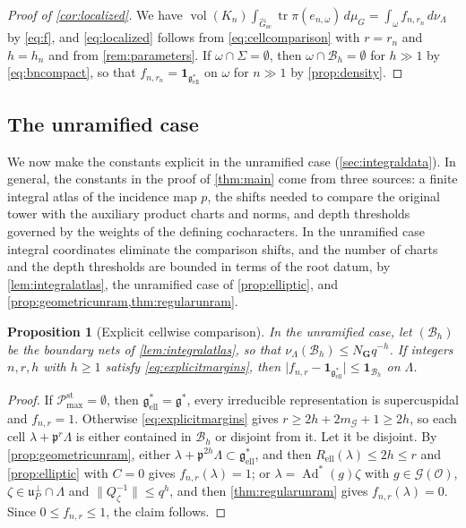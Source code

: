 \documentclass[11pt,reqno]{amsart}
\numberwithin{equation}{section}
\theoremstyle{plain}
\newtheorem{proposition}[theorem]{Proposition}
\theoremstyle{definition}
\theoremstyle{remark}
\theoremstyle{plain}
\newcommand{\OO}{\mathcal{O}}    %
\newcommand{\pp}{\mathfrak{p}}   %
\newcommand{\Lat}{\mathcal{L}}   %
\newcommand{\dLat}{\Lambda}      %
\newcommand{\bG}{\mathbf{G}}     %
\newcommand{\g}{\mathfrak{g}}    %
\newcommand{\gd}{\mathfrak{g}^*} %
\newcommand{\uu}{\mathfrak{u}}   %
\newcommand{\Ell}[2][]{#2_{#1\mathrm{ell}}}   %
\newcommand{\Bad}{\mathcal{B}}   %
\newcommand{\bnets}{boundary nets}
\newcommand{\Pc}{\mathscr{P}^{\mathrm{st}}_{\mathrm{max}}}    %
\newcommand{\Pcss}{\mathscr{P}^{\mathrm{ss}}_{\mathrm{max}}}  %
\newcommand{\Nss}{N_{\bG}}  %
\newcommand{\Gsc}{\widehat{G}_{\mathrm{sc}}}    %
\newcommand{\cG}{\mathcal{G}}                   %
\newcommand{\one}{\mathbf{1}}
\newcommand{\abs}[1]{\lvert#1\rvert}
\newcommand{\norm}[1]{\lVert#1\rVert}
\DeclareMathOperator{\vol}{vol}
\DeclareMathOperator{\tr}{tr}
\DeclareMathOperator{\Ad}{Ad}
\newcommand{\erad}{R_{\mathrm{ell}}}
\newcommand{\lf}{\lambda}
\newcommand{\cell}{\omega}
\newcommand{\nf}{\zeta}
\newcommand{\Crv}{\Sigma}
\newcommand{\iatlas}{integral atlas}
\begin{document}
\begin{proof}[Proof of \cref{cor:localized}]
We have
$\vol(K_n)\int_{\Gsc}\tr\pi(e_{n,\cell})\,d\mu_G=\int_\cell f_{n,r_n}\,d\nu_{\dLat}$ by
\eqref{eq:f}, and \eqref{eq:localized} follows from \eqref{eq:cellcomparison}
with $r=r_n$ and $h=h_n$ and from \cref{rem:parameters}. If
$\cell\cap\Crv=\emptyset$, then $\cell\cap\Bad_h=\emptyset$ for $h\gg1$ by
\eqref{eq:bncompact}, so that $f_{n,r_n}=\one_{\Ell{\gd}}$ on $\cell$
for $n\gg1$ by \cref{prop:density}.
\end{proof}

\subsection{The unramified case}\label{sec:uniform}
We now make the constants explicit in the unramified case
(\cref{sec:integraldata}). In general, the constants in the proof of
\cref{thm:main} come from three sources: a finite \iatlas{} of the incidence
map $p$, the shifts needed to compare the original tower with the auxiliary
product charts and norms, and depth thresholds governed by the weights of
the defining cocharacters. In the unramified case integral coordinates
eliminate the comparison shifts, and the number of charts and the depth
thresholds are bounded in terms of the root datum, by
\cref{lem:integralatlas}, the unramified case of \cref{prop:elliptic}, and
\cref{prop:geometricunram,thm:regularunram}.

\begin{proposition}[Explicit cellwise comparison]\label{prop:explicitcell}
In the unramified case, let $(\Bad_h)$ be the \bnets{} of
\cref{lem:integralatlas}, so that $\nu_{\dLat}(\Bad_h)\le \Nss q^{-h}$. If integers
$n,r,h$ with $h\ge1$ satisfy \eqref{eq:explicitmargins}, then
$\abs{f_{n,r}-\one_{\Ell{\gd}}}\le\one_{\Bad_h}$ on $\dLat$.
\end{proposition}

\begin{proof}
If $\Pc=\emptyset$, then $\Ell{\gd}=\gd$, every irreducible representation
is supercuspidal and $f_{n,r}=1$. Otherwise \eqref{eq:explicitmargins} gives
$r\ge2h+2m_{\cG}+1\ge2h$, so each cell $\lf+\pp^r\dLat$ is either contained
in $\Bad_h$ or disjoint from it. Let it be disjoint. By
\cref{prop:geometricunram}, either $\lf+\pp^{2h}\dLat\subset\Ell{\gd}$, and then
$\erad(\lf)\le2h\le r$ and \cref{prop:elliptic} with $C=0$ gives
$f_{n,r}(\lf)=1$; or $\lf=\Ad^*(g)\nf$ with $g\in\cG(\OO)$,
$\nf\in\uu_P^\perp\cap\dLat$ and $\norm{Q_\nf^{-1}}\le q^h$, and then
\cref{thm:regularunram} gives $f_{n,r}(\lf)=0$. Since
$0\le f_{n,r}\le1$, the claim follows.
\end{proof}
\end{document}
